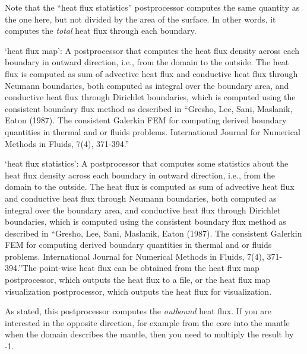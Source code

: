 \begin{itemize}
Note that the ``heat flux statistics'' postprocessor computes the same quantity as the one here, but not divided by the area of the surface. In other words, it computes the \textit{total} heat flux through each boundary.

`heat flux map': A postprocessor that computes the heat flux density across each boundary in outward direction, i.e., from the domain to the outside. The heat flux is computed as sum of advective heat flux and conductive heat flux through Neumann boundaries, both computed as integral over the boundary area, and conductive heat flux through Dirichlet boundaries, which is computed using the consistent boundary flux method as described in ``Gresho, Lee, Sani, Maslanik, Eaton (1987). The consistent Galerkin FEM for computing derived boundary quantities in thermal and or fluids problems. International Journal for Numerical Methods in Fluids, 7(4), 371-394.''

`heat flux statistics': A postprocessor that computes some statistics about the heat flux density across each boundary in outward direction, i.e., from the domain to the outside. The heat flux is computed as sum of advective heat flux and conductive heat flux through Neumann boundaries, both computed as integral over the boundary area, and conductive heat flux through Dirichlet boundaries, which is computed using the consistent boundary flux method as described in ``Gresho, Lee, Sani, Maslanik, Eaton (1987). The consistent Galerkin FEM for computing derived boundary quantities in thermal and or fluids problems. International Journal for Numerical Methods in Fluids, 7(4), 371-394.''The point-wise heat flux can be obtained from the heat flux map postprocessor, which outputs the heat flux to a file, or the heat flux map visualization postprocessor, which outputs the heat flux for visualization. 

As stated, this postprocessor computes the \textit{outbound} heat flux. If you are interested in the opposite direction, for example from the core into the mantle when the domain describes the mantle, then you need to multiply the result by -1.



\end{itemize}
